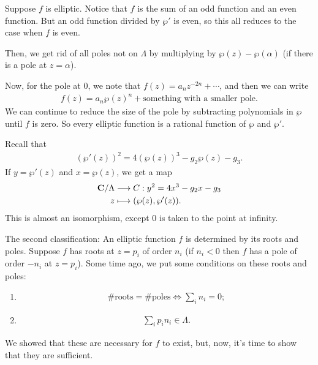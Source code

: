 \documentclass[11pt, oneside,margin=1in]{article}
\begin{document}
Suppose $f$ is elliptic. Notice that $f$ is the sum of an odd function and an even function. But an odd function divided by $\wp'$ is even, so this all reduces to the case when $f$ is even. 

Then, we get rid of all poles not on $\Lambda$ by multiplying by $\wp(z) -\wp (\alpha)$ (if there is a pole at $z=\alpha$).

Now, for the pole at $0$, we note that $f(z) = a_n z^{-2n} + \cdots$, and then we can write 
\begin{align*}
	f(z) = a_n \wp(z)^n + \textrm{something with a smaller pole}.
\end{align*}
We can continue to reduce the size of the pole by subtracting polynomials in $\wp$ until $f$ is zero. So every elliptic function is a rational function of $\wp$ and $\wp'$.

Recall that
\begin{align*}
	(\wp'(z)) ^2 = 4(\wp(z)) ^3 - g_2\wp(z) -  g_3.
\end{align*}
If $y=\wp'(z)$ and $x = \wp(z)$, we get a map 
\begin{align*}
	\mathbf C/\Lambda &\longrightarrow C:y^2 = 4x^3 -g_2x-g_3\\
	  z &\longmapsto (\wp(z),\wp' (z)).
\end{align*}
This is almost an isomorphism, except $0$ is taken to the point at infinity. 

The second classification: An elliptic function $f$ is determined by its roots and poles. Suppose $f$ has roots at $z=p_i$ of order $n_i$ (if $n_i<0$ then $f$ has a pole of order $-n_i$ at $z=p_i$). Some time ago, we put some conditions on these roots and poles:
\begin{enumerate}
	\item \begin{align*}
		\# \textrm{roots} = \# \textrm{poles} \iff \sum_{i}^{} n_i=0;
	\end{align*}
\item \begin{align*}
	\sum_{i}^{} p_in_i \in \Lambda.
\end{align*}
\end{enumerate}
We showed that these are necessary for $f$ to exist, but, now, it's time to show that they are sufficient. 
\end{document}
